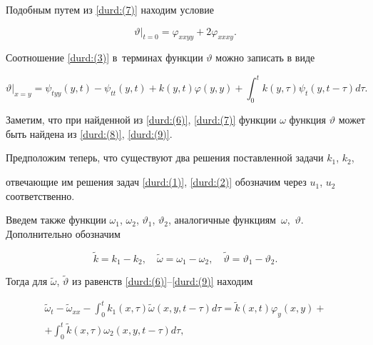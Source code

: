 Подобным путем из \eqref{durd:(7)} находим условие

\begin{equation}

\label{durd:(9)}

\vartheta\big|_{t=0}=\varphi_{xxyy}+2\varphi_{xxxy}. 

\end{equation}





Соотношение \eqref{durd:(3)} в~терминах функции $\vartheta$ можно записать в виде

\begin{equation}

\label{durd:(10)}

\vartheta\big|_{x=y}=\psi_{tyy}(y,t)-\psi_{tt}(y,t)+k(y,t)\varphi(y,y)+\int^{t}_{0}k(y,\tau)\psi_{t}(y,t-\tau)d\tau .

\end{equation}



Заметим, что при найденной из \eqref{durd:(6)}, \eqref{durd:(7)} функции $\omega$ функция $\vartheta$ может быть найдена из \eqref{durd:(8)}, \eqref{durd:(9)}.



Предположим теперь, что существуют два решения поставленной  задачи $k_{1}$, $k_{2}$, 

отвечающие им решения задач \eqref{durd:(1)}, \eqref{durd:(2)}  обозначим через $u_{1}$, $u_{2}$ соответственно. 

Введем также функции $\omega_{1}$, $\omega_{2}$, $\vartheta_{1}$, $\vartheta_{2}$, аналогичные функциям~$\omega$,~$\vartheta$. Дополнительно обозначим

$$\tilde{k}=k_{1}-k_{2}, \quad  \widetilde{\omega}=\omega_{1}-\omega_{2}, \quad  \widetilde{\vartheta}=\vartheta_{1}-\vartheta_{2}.

$$



Тогда для $\widetilde{\omega}$, $\widetilde{\vartheta}$ из равенств \eqref{durd:(6)}--\eqref{durd:(9)}  находим

\begin{multline}

\label{durd:(11)}

\widetilde{\omega}_{t}-\widetilde{\omega}_{xx}-\int^{t}_{0}k_{1}(x,\tau)\widetilde{\omega}(x,y,t-\tau)d\tau=\tilde{k}(x,t)\varphi_{y}(x,y)+

\\

+\int^{t}_{0}\tilde{k}(x,\tau)\omega_{2}(x,y,t-\tau)d\tau, 

\end{multline}

